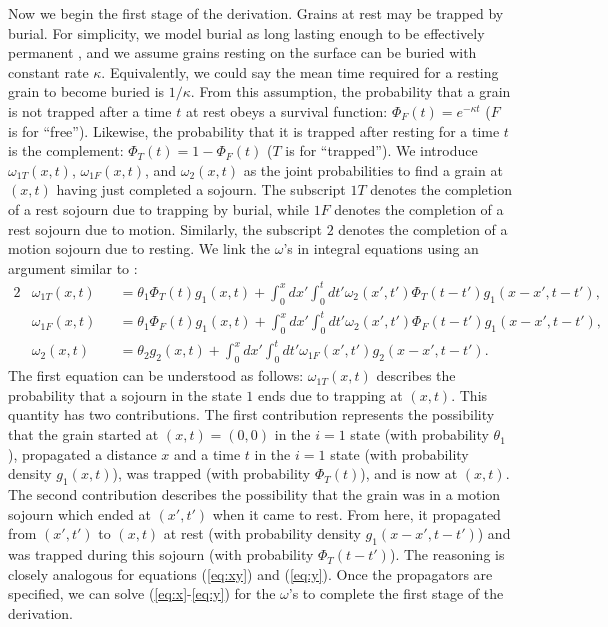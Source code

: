 \documentclass[draft,grl]{agujournal2018}
\newcommand\om{\omega}
\begin{document}
Now we begin the first stage of the derivation.
Grains at rest may be trapped by burial.
For simplicity, we model burial as long lasting enough to be effectively permanent \citep[e.g.,][]{Wu2019}, and we assume grains resting on the surface can be buried with constant rate $\kappa$.
Equivalently, we could say the mean time required for a resting grain to become buried is $1/\kappa$.
From this assumption, the probability that a grain is not trapped after a time $t$ at rest obeys a survival function: $\Phi_F(t) = e^{-\kappa t}$ ($F$ is for ``free''). Likewise, the probability that it is trapped after resting for a time $t$ is the complement: $\Phi_T(t) = 1-\Phi_F(t)$ ($T$ is for ``trapped'').
We introduce $\omega_{1T}(x,t)$, $\omega_{1F}(x,t)$, and $\omega_2(x,t)$ as the joint probabilities to find a grain at $(x,t)$ having just completed a sojourn.
The subscript ${1T}$ denotes the completion of a rest sojourn due to trapping by burial, while $1F$ denotes the completion of a rest sojourn due to motion.
Similarly, the subscript $2$ denotes the completion of a motion sojourn due to resting.
We link the $\omega$'s in integral equations using an argument similar to \citet{Weiss1994}:
\begin{alignat}{2}
&\om_{1T}(x,t) &&= \theta_1\Phi_T(t)g_1(x,t) + \int_0^x dx' \int_0^t dt' \om_2(x',t')\Phi_T(t-t')g_1(x-x',t-t')\label{eq:x},\\
&\om_{1F}(x,t) &&= \theta_1\Phi_F(t)g_1(x,t) + \int_0^x dx' \int_0^t dt' \om_2(x',t') \Phi_F(t-t') g_1(x-x',t-t'),\label{eq:xy}\\
&\om_2(x,t) &&= \theta_2 g_2(x,t) + \int_0^x dx' \int_0^t dt' \om_{1F}(x',t')g_2(x-x',t-t'). \label{eq:y}
\end{alignat}
The first equation can be understood as follows: $\omega_{1T}(x,t)$ describes the probability  that a sojourn in the state $1$ ends due to trapping at $(x,t)$. This quantity has two contributions. The first contribution represents the possibility that the grain started at $(x,t)=(0,0)$ in the $i=1$ state (with probability $\theta_1$), propagated a distance $x$ and a time $t$ in the $i=1$ state (with probability density $g_1(x,t)$), was trapped (with probability $\Phi_T(t)$), and is now at $(x,t)$. 
The second contribution describes the possibility that the grain was in a motion sojourn which ended at $(x',t')$ when it came to rest. From here, it propagated from $(x',t')$ to $(x,t)$ at rest (with probability density $g_1(x-x',t-t')$) and was trapped during this sojourn (with probability $\Phi_T(t-t')$).
The reasoning is closely analogous for equations (\ref{eq:xy}) and (\ref{eq:y}).
Once the propagators are specified, we can solve (\ref{eq:x}-\ref{eq:y}) for the $\omega$'s to complete the first stage of the derivation.
\end{document}
